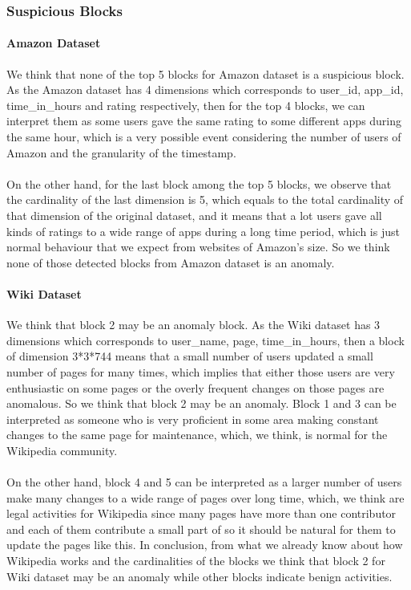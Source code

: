 \subsubsection{Suspicious Blocks}
\paragraph{Amazon Dataset} We think that none of the top 5 blocks for Amazon dataset is a suspicious block. As the Amazon dataset has 4 dimensions which corresponds to user\_id, app\_id, time\_in\_hours and rating respectively, then
for the top 4 blocks, we can interpret them as some users gave the same rating to some different apps during the same hour, which is a very possible event considering the number of users of Amazon and the granularity of the timestamp.
\paragraph{} On the other hand, for the last block among the top 5 blocks, we observe that the cardinality of the last dimension is 5, which equals to the total cardinality of that dimension of the original dataset,
and it means that a lot users gave all kinds of ratings to a wide range of apps during a long time period, which is just normal behaviour that we expect from websites of Amazon's size.
So we think none of those detected blocks from Amazon dataset is an anomaly.
\paragraph{Wiki Dataset} We think that block 2 may be an anomaly block. As the Wiki dataset has 3 dimensions which corresponds to user\_name, page, time\_in\_hours, then a block of dimension 3*3*744 means that a small number of users
updated a small number of pages for many times, which implies that either those users are very enthusiastic on some pages or the overly frequent changes on those pages are anomalous. So we think that block 2 may be an anomaly.
Block 1 and 3 can be interpreted as someone who is very proficient in some area making constant changes to the same page for maintenance, which, we think, is normal for the Wikipedia community.
\paragraph{} On the other hand, block 4 and 5 can be interpreted as a larger number of users make many changes to a wide range of pages over long time, which, we think are legal activities for Wikipedia since many pages have more than one contributor and each of them contribute a small
part of so it should be natural for them to update the pages like this. In conclusion, from what we already know about how Wikipedia works and the cardinalities of the blocks we think that block 2 for Wiki dataset may be an anomaly while
other blocks indicate benign activities.
\newpage
